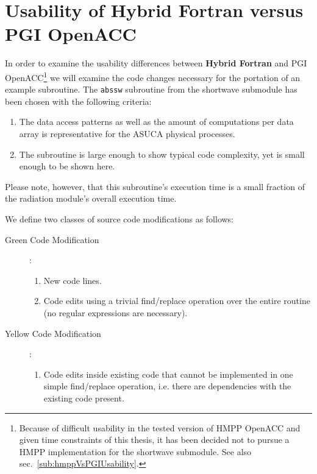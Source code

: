 \clearpage
\section{Usability of Hybrid Fortran versus PGI OpenACC} \label{sec:usabilityValidation}

In order to examine the usability differences between \textbf{Hybrid Fortran} and PGI OpenACC\footnote{Because of difficult usability in the tested version of HMPP OpenACC and given time constraints of this thesis, it has been decided not to pursue a HMPP implementation for the shortwave submodule. See also sec.~\ref{sub:hmppVsPGIUsability}.} we will examine the code changes necessary for the portation of an example subroutine. The \verb|abssw| subroutine from the shortwave submodule has been chosen with the following criteria:

\begin{enumerate}
 \item The data access patterns as well as the amount of computations per data array is representative for the ASUCA physical processes.
 \item The subroutine is large enough to show typical code complexity, yet is small enough to be shown here.
\end{enumerate}

Please note, however, that this subroutine's execution time is a small fraction of the radiation module's overall execution time.

We define two classes of source code modifications as follows:

\begin{description}
 \item [Green Code Modification]: \begin{enumerate}
    \item New code lines.
    \item Code edits using a trivial find/replace operation over the entire routine (no regular expressions are necessary).
  \end{enumerate}
 \item [Yellow Code Modification]: \begin{enumerate}
    \item Code edits inside existing code that cannot be implemented in one simple find/replace operation, i.e. there are dependencies with the existing code present.
  \end{enumerate}
\end{description}

